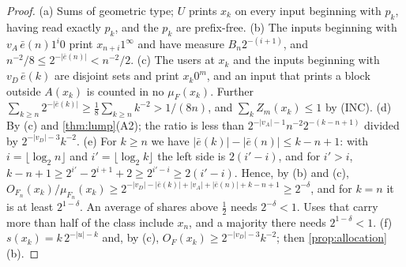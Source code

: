 \begin{proof}
(a) Sums of geometric type; $U$ prints $x_k$ on every input beginning with $p_k$, having read exactly $p_k$,
and the $p_k$ are prefix-free. (b) The inputs beginning with $v_A\,\bar e(n)1^i0$ print $x_{n+i}1^\infty$ and
have measure $B_n2^{-(i+1)}$, and $n^{-2}/8\le2^{-|\bar e(n)|}<n^{-2}/2$. (c) The users at $x_k$ and the
inputs beginning with $v_D\,\bar e(k)$ are disjoint sets and print $x_k0^m$, and an input that prints a block
outside $A(x_k)$ is counted in no $\mu_F(x_k)$. Further $\sum_{k\ge n}2^{-|\bar e(k)|}\ge\frac18\sum_{k\ge
n}k^{-2}>1/(8n)$, and $\sum_kZ_m(x_k)\le1$ by (INC). (d) By (c) and \cref{thm:lump}(A2); the ratio is less
than $2^{-|v_A|-1}n^{-2}2^{-(k-n+1)}$ divided by $2^{-|v_D|-3}k^{-2}$. (e) For $k\ge n$ we have $|\bar
e(k)|-|\bar e(n)|\le k-n+1$: with $i=\lfloor\log_2n\rfloor$ and $i'=\lfloor\log_2k\rfloor$ the left side is
$2(i'-i)$, and for $i'>i$, $k-n+1\ge2^{i'}-2^{i+1}+2\ge2^{i'-i}\ge2(i'-i)$. Hence, by (b) and (c),
$O_{F_n}(x_k)/\mu_{F_n}(x_k)\ge2^{-|v_D|-|\bar e(k)|+|v_A|+|\bar e(n)|+k-n+1}\ge2^{-\delta}$, and for $k=n$ it
is at least $2^{1-\delta}$. An average of shares above $\frac12$ needs $2^{-\delta}<1$. Uses that carry more
than half of the class include $x_n$, and a majority there needs $2^{1-\delta}<1$. (f) $s(x_k)=k\,2^{-|u|-k}$
and, by (c), $O_F(x_k)\ge2^{-|v_D|-3}k^{-2}$; then \cref{prop:allocation}(b).
\end{proof}

